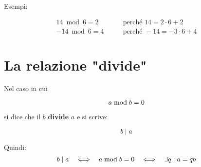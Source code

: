 Esempi:

\begin{align*}
    14 \bmod 6 = 2 &\quad\quad\text{perché } 14 = 2\cdot 6 + 2 \\
    -14 \bmod 6 = 4 &\quad\quad\text{perché } -14 = -3 \cdot 6 + 4
\end{align*}

\section{La relazione "divide"}

\begin{mdframed}
\begin{definizione}
    Nel caso in cui

    \begin{equation*}
        a  \bmod  b = 0
    \end{equation*}
    
    si dice che il $b$ \textbf{divide} $a$ e si scrive:

    \begin{equation}
        b  \mid  a
    \end{equation}

    Quindi:
    \begin{equation*}
        b  \mid  a  \quad\Longleftrightarrow\quad  a  \bmod  b = 0  \quad\Longleftrightarrow\quad  \exists q : a = qb
    \end{equation*}
    
\end{definizione}
\end{mdframed}
   

